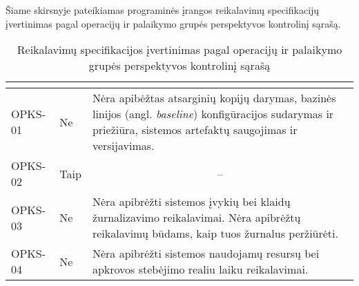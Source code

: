 \documentclass{VUMIFPSkursinis}
\begin{document}
Šiame skirsnyje pateikiamas programinės įrangos reikalavimų specifikacijų įvertinimas pagal operacijų ir palaikymo grupės perspektyvos kontrolinį sąrašą.
\begin{center}

	\begin{longtable}{|C{2cm}|L{2.5cm}|L{10cm}|}

		\caption{Reikalavimų specifikacijos įvertinimas pagal operacijų ir palaikymo grupės perspektyvos kontrolinį sąrašą}
		\label{table:VKS}

		\\ \hline
		 &
		 &
		\\ \hline
		OPKS-01                                         &
		Ne                                              &
		Nėra apibėžtas atsarginių kopijų darymas, bazinės linijos (angl. \textit{baseline}) konfigūracijos sudarymas ir priežiūra, sistemos artefaktų saugojimas ir versijavimas.                                                                                          \\ \hline
		OPKS-02                                         &
		Taip                                            &
		                                                                                                                                                                                                                                           \\ \hline
		OPKS-03                                         &
		Ne                                              &
		Nėra apibrėžti sistemos įvykių bei klaidų žurnalizavimo reikalavimai. Nėra apibrėžtų reikalavimų būdams, kaip tuos žurnalus peržiūrėti.                                                                                                                            \\ \hline
		OPKS-04                                         &
		Ne                                              &
		Nėra apibrėžti sistemos naudojamų resursų bei apkrovos stebėjimo realiu laiku reikalavimai.                                                                                                                                                                        \\ \hline

\end{longtable}
\end{center}
\end{document}

